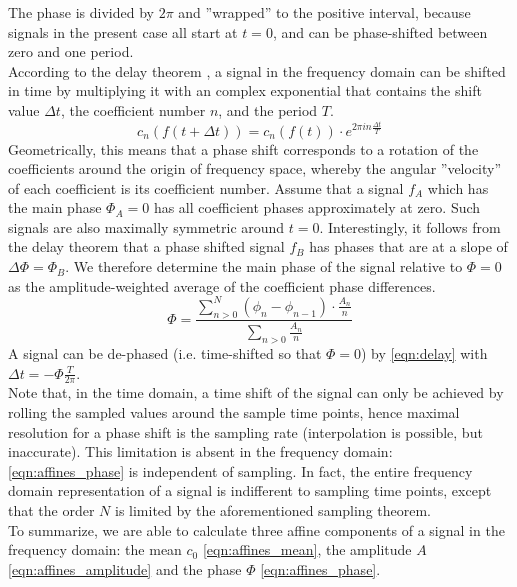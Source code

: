 \documentclass[10pt, a4paper]{article}
\begin{document}
The phase is divided by $2\pi$ and ''wrapped'' to the positive interval, because signals in the present case all start at $t=0$, and can be phase-shifted between zero and one period. 
\\According to the delay theorem \citep[also shift theorem,][p. 111]{Bracewell2000}, a signal in the frequency domain can be shifted in time by multiplying it with an complex exponential that contains the shift value $\Delta t$, the coefficient number $n$, and the period $T$. 
\begin{equation}\label{eqn:delay}
  c_{n}\left( f(t+\Delta t)\right) = c_{n}\left( f(t)\right)\cdot e^{2\pi i n \frac{\Delta t}{T}}
\end{equation}
Geometrically, this means that a phase shift corresponds to a rotation of the coefficients around the origin of frequency space, whereby the angular ''velocity'' of each coefficient is its coefficient number. 
Assume that a signal $f_{A}$ which has the main phase $\Phi_{A} = 0$ has all coefficient phases approximately at zero. 
Such signals are also maximally symmetric around $t=0$. 
Interestingly, it follows from the delay theorem that a phase shifted signal $f_{B}$ has phases that are at a slope of $\Delta \Phi = \Phi_{B}$. 
We therefore determine the main phase of the signal relative to $\Phi=0$ as the amplitude-weighted average of the coefficient phase differences. 
	\begin{equation}\label{eqn:affines_phase}
	\Phi = \frac{\sum_{n>0}^{N} (\phi_{n}-\phi_{n-1})\cdot \frac{A_{n}}{n}}{\sum_{n>0} \frac{A_{n}}{n}}
	\end{equation}
A signal can be de-phased (i.e. time-shifted so that $\Phi=0$) by \eqref{eqn:delay} with $\Delta t = -\Phi \frac{T}{2\pi}$. 
\\Note that, in the time domain, a time shift of the signal can only be achieved by rolling the sampled values around the sample time points, hence maximal resolution for a phase shift is the sampling rate (interpolation is possible, but inaccurate). 
This limitation is absent in the frequency domain: \eqref{eqn:affines_phase} is independent of sampling. 
In fact, the entire frequency domain representation of a signal is indifferent to sampling time points, except that the order $N$ is limited by the aforementioned sampling theorem. 
\\To summarize, we are able to calculate three affine components of a signal in the frequency domain: the mean $c_{0}$ \eqref{eqn:affines_mean}, the amplitude $A$ \eqref{eqn:affines_amplitude} and the phase $\Phi$ \eqref{eqn:affines_phase}. 
\end{document}

